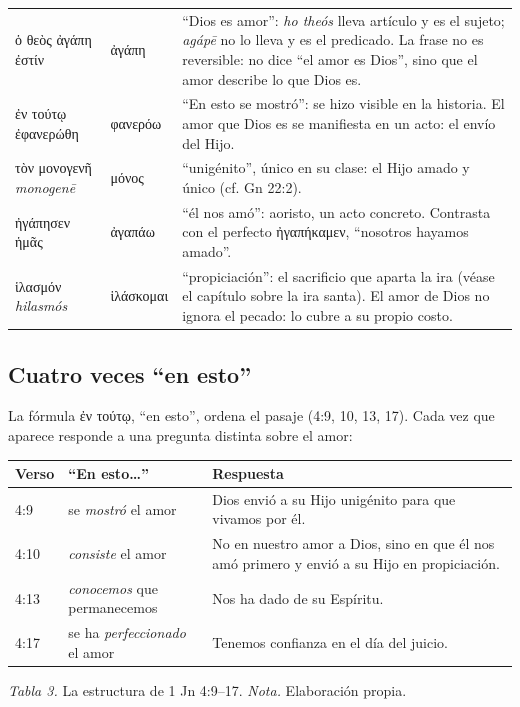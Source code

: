 \documentclass[11pt,letterpaper]{article}
\newcommand{\grc}[1]{\foreignlanguage{ancientgreek}{#1}}
\begin{document}
\begin{filologia}[1 Jn 4:8--10]
\begin{tabular}{@{}L{3.6cm}L{1.6cm}L{9.6cm}@{}}
\grc{ὁ θεὸς ἀγάπη ἐστίν} & \grc{ἀγάπη} & ``Dios es amor'': \emph{ho theós} lleva artículo y es el sujeto; \emph{agápē} no lo lleva y es el predicado. La frase no es reversible: no dice ``el amor es Dios'', sino que el amor describe lo que Dios es. \\[2pt]
\grc{ἐν τούτῳ ἐφανερώθη} & \grc{φανερόω} & ``En esto se mostró'': se hizo visible en la historia. El amor que Dios es se manifiesta en un acto: el envío del Hijo. \\[2pt]
\grc{τὸν μονογενῆ} \emph{monogenē} & \grc{μόνος} & ``unigénito'', único en su clase: el Hijo amado y único (cf. Gn 22:2). \\[2pt]
\grc{ἠγάπησεν ἡμᾶς} & \grc{ἀγαπάω} & ``él nos amó'': aoristo, un acto concreto. Contrasta con el perfecto \grc{ἠγαπήκαμεν}, ``nosotros hayamos amado''. \\[2pt]
\grc{ἱλασμόν} \emph{hilasmós} & \grc{ἱλάσκομαι} & ``propiciación'': el sacrificio que aparta la ira (véase el capítulo sobre la ira santa). El amor de Dios no ignora el pecado: lo cubre a su propio costo. \\
\end{tabular}
\end{filologia}

\subsection{Cuatro veces ``en esto''}
La fórmula \grc{ἐν τούτῳ}, ``en esto'', ordena el pasaje (4:9, 10, 13, 17). Cada vez que aparece responde a una pregunta distinta sobre el amor:

\begin{center}\small\renewcommand{\arraystretch}{1.2}
\begin{tabular}{@{}L{1.6cm}L{4.4cm}L{8.8cm}@{}}
\toprule
\textbf{Verso} & \textbf{``En esto\ldots''} & \textbf{Respuesta} \\ :9 & se \emph{mostró} el amor & Dios envió a su Hijo unigénito para que vivamos por él. \\
4:10 & \emph{consiste} el amor & No en nuestro amor a Dios, sino en que él nos amó primero y envió a su Hijo en propiciación. \\
4:13 & \emph{conocemos} que permanecemos & Nos ha dado de su Espíritu. \\
4:17 & se ha \emph{perfeccionado} el amor & Tenemos confianza en el día del juicio. \\
\bottomrule
\end{tabular}\par
{\footnotesize\color{gris}\textit{Tabla 3.} La estructura de 1 Jn 4:9--17. \textit{Nota.} Elaboración propia.}
\end{center}
\end{document}

